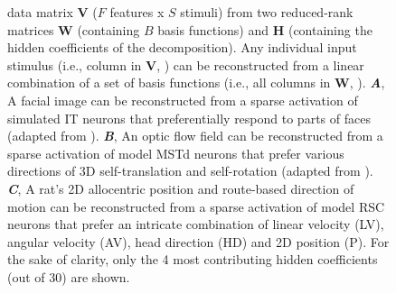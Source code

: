 \begin{figure}[ht]
	\centering
    \caption{ data matrix \textbf{V}
             ($F$ features x $S$ stimuli)
             from two reduced-rank matrices \textbf{W}
             (containing $B$ basis functions) and \textbf{H}
             (containing the hidden coefficients of the decomposition).
             Any individual input stimulus (i.e., column in \textbf{V}, )
             can be reconstructed from a linear combination
             of a set of basis functions (i.e., all columns in \textbf{W}, 
             ).
         \textbf{\emph{A}},
             A facial image can be reconstructed from a sparse activation
             of simulated \acs{IT} neurons that
             preferentially respond to parts of faces
             (adapted from \cite{LeeSeung1999}).
         \textbf{\emph{B}},
             An optic flow field can be reconstructed from a sparse
             activation of model \acs{MSTd} neurons that prefer various
             directions of 3D self-translation and self-rotation
             (adapted from \cite{Beyeler2016}).
         \textbf{\emph{C}},
             A rat's 2D allocentric position and route-based direction of
             motion can be reconstructed from a sparse activation of
             model \acs{RSC} neurons that prefer an intricate combination of
             linear velocity (LV), angular velocity (AV), head direction (HD)
             and 2D position (P).
             For the sake of clarity, only the 4 most contributing hidden
             coefficients (out of 30) are shown.}
	\label{fig:NMF|reconstruction}
\end{figure}


